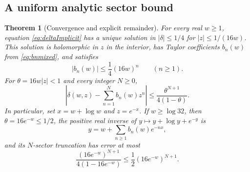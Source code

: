 \documentclass[11pt,a4paper]{article}
\newtheorem{theorem}{Theorem}[section]
\theoremstyle{definition}
\theoremstyle{remark}
\begin{document}
\subsection{A uniform analytic sector bound}
\begin{theorem}[Convergence and explicit remainder]\label{thm:analytic}
For every real $w\ge1$, equation \eqref{eq:deltaImplicit} has a unique
solution in $|\delta|\le1/4$ for $|z|\le1/(16w)$. This solution is
holomorphic in $z$ in the interior, has Taylor coefficients $b_n(w)$ from
\eqref{eq:bnmixed}, and satisfies
\begin{equation}\label{eq:coefbound}
 |b_n(w)|\le\frac14(16w)^n\qquad(n\ge1).
\end{equation}
For $\theta=16w|z|<1$ and every integer $N\ge0$,
\begin{equation}\label{eq:uniformbound}
 \left|\delta(w,z)-\sum_{n=1}^{N}b_n(w)z^n\right|
 \le \frac{\theta^{N+1}}{4(1-\theta)}.
\end{equation}
In particular, set $x=w+\log w$ and $z=e^{-x}$. If $w\ge\log32$, then
$\theta=16e^{-w}\le1/2$, the positive real inverse of
$y\mapsto y+\log y+e^{-y}$ is
\[
 y=w+\sum_{n\ge1}b_n(w)e^{-nx},
\]
and its $N$-sector truncation has error at most
\begin{equation}\label{eq:realbound}
 \frac{(16e^{-w})^{N+1}}{4(1-16e^{-w})}
 \le\frac12(16e^{-w})^{N+1}.
\end{equation}
\end{theorem}
\end{document}
